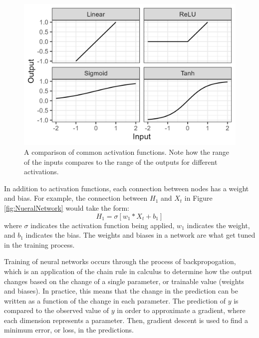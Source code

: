 \begin{figure}[ht]
    \centering
    \includegraphics[width=0.8\linewidth]{"Figures/Activations.png"}
    \caption{A comparison of common activation functions. Note how the range of the inputs compares to the range of the outputs for different activations.}
    \label{fig:Activations}
\end{figure}

In addition to activation functions, each connection between nodes has a weight and bias. For example, the connection between $H_1$ and $X_t$ in Figure \ref{fig:NueralNetwork} would take the form:
\begin{equation*}
    H_1 = \sigma[w_1*X_t + b_1]
\end{equation*}
where $\sigma$ indicates the activation function being applied, $w_1$ indicates the weight, and $b_1$ indicates the bias. The weights and biases in a network are what get tuned in the training process.

Training of neural networks occurs through the process of backpropogation, which is an application of the chain rule in calculus to determine how the output changes based on the change of a single parameter, or trainable value (weights and biases). In practice, this means that the change in the prediction can be written as a function of the change in each parameter. The prediction of $y$ is compared to the observed value of $y$ in order to approximate a gradient, where each dimension represents a parameter. Then, gradient descent is used to find a minimum error, or loss, in the predictions.